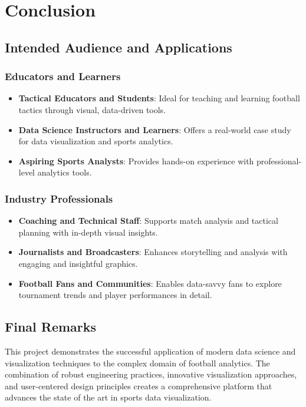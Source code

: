 \documentclass[12pt,a4paper]{article}
\begin{document}
\section{Conclusion}
\subsection{Intended Audience and Applications}

\subsubsection{Educators and Learners}
\begin{itemize}
\item \textbf{Tactical Educators and Students}: Ideal for teaching and learning football tactics through visual, data-driven tools.
\item \textbf{Data Science Instructors and Learners}: Offers a real-world case study for data visualization and sports analytics.
\item \textbf{Aspiring Sports Analysts}: Provides hands-on experience with professional-level analytics tools.
\end{itemize}

\subsubsection{Industry Professionals}
\begin{itemize}
\item \textbf{Coaching and Technical Staff}: Supports match analysis and tactical planning with in-depth visual insights.
\item \textbf{Journalists and Broadcasters}: Enhances storytelling and analysis with engaging and insightful graphics.
\item \textbf{Football Fans and Communities}: Enables data-savvy fans to explore tournament trends and player performances in detail.
\end{itemize}

\subsection{Final Remarks}

This project demonstrates the successful application of modern data science and visualization techniques to the complex domain of football analytics. The combination of robust engineering practices, innovative visualization approaches, and user-centered design principles creates a comprehensive platform that advances the state of the art in sports data visualization.
\end{document}
